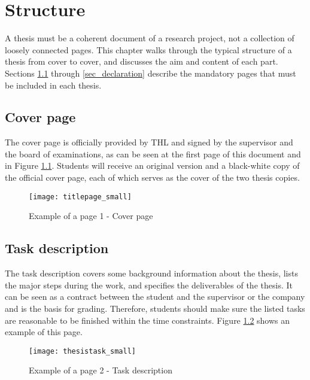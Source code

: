 \chapter{Structure} \label{chap_structure}

A thesis must be a coherent document of a research project, not a collection of loosely connected pages. This chapter walks through the typical structure of a thesis from cover to cover, and discusses the aim and content of each part. Sections \ref{sec_coverpage} through \ref{sec_declaration} describe the mandatory pages that must be included in each thesis.

\section{Cover page} \label{sec_coverpage}

The cover page is officially provided by THL and signed by the supervisor and the board of examinations, as can be seen at the first page of this document and in Figure \ref{fig:coverpage}. Students will receive an original version and a black-white copy of the official cover page, each of which serves as the cover of the two thesis copies.

\begin{figure}[htb]
  \centering
  \texttt{[image: titlepage\_small]}\\
  \caption{Example of a page 1 - Cover page}\label{fig:coverpage}
\end{figure}

\section{Task description}

The task description covers some background information about the thesis, lists the major steps during the work, and specifies the deliverables of the thesis. It can be seen as a contract between the student and the supervisor or the company and is the basis for grading. Therefore, students should make sure the listed tasks are reasonable to be finished within the time constraints. Figure \ref{fig:task} shows an example of this page.

\begin{figure}[htb]
  \centering
  \texttt{[image: thesistask\_small]}\\ 
  \caption{Example of a page 2 - Task description}\label{fig:task}
\end{figure}

